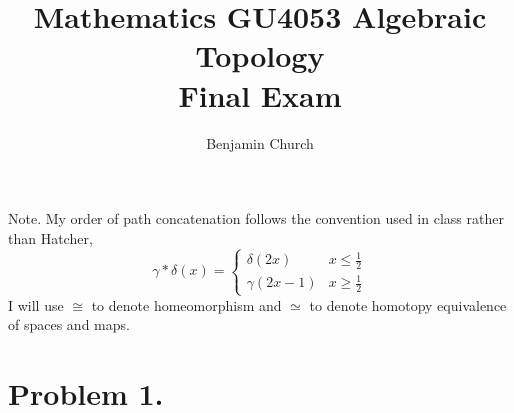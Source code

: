 \documentclass[12pt]{extarticle}
\begin{document}
{\title{%
	\large \textbf{Mathematics GU4053 Algebraic Topology
	\\ Final Exam} \vspace{-2ex}}
\author{Benjamin Church }
\maketitle}

Note. My order of path concatenation follows the convention used in class rather than Hatcher,
\[\gamma * \delta(x) = \begin{cases}
\delta(2x) & x \le \tfrac{1}{2} \\
\gamma(2x - 1) & x \ge \tfrac{1}{2}
\end{cases}\]
I will use $\cong$ to denote homeomorphism and $\simeq$ to denote homotopy equivalence of spaces and maps.
 
\section*{Problem 1.}
\end{document}
